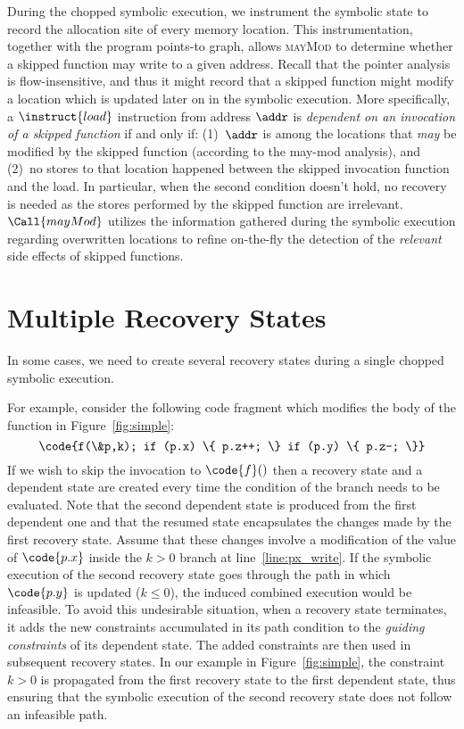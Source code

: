 During the chopped symbolic execution, we instrument the symbolic
state to record the allocation site of every memory location. This
instrumentation, together with the program points-to graph, allows
\textsc{mayMod} to determine whether a skipped function may write to a
given address. Recall that the pointer analysis is flow-insensitive,
and thus it might record that a skipped function might modify a
location which is updated later on in the symbolic execution.  More
specifically, a $\instruct{load}$ instruction from address $\addr$ is
\emph{dependent on an invocation of a skipped function} if and only
if: (1)~$\addr$ is among the locations that \textit{may} be modified
by the skipped function (according to the may-mod analysis), and
(2)~no stores to that location happened between the skipped invocation
function and the load. In particular, when the second condition
doesn't hold, no recovery is needed as the stores performed by the
skipped function are irrelevant. $\Call{mayMod}$ utilizes the
information gathered during the symbolic execution regarding
overwritten locations to refine on-the-fly the detection of the
\emph{relevant} side effects of skipped functions.

\section{Multiple Recovery States}
\label{Se:MultiRecovery}
In some cases, we need to create several recovery states during a
single chopped symbolic execution.

For example, consider the following code fragment which modifies the
body of the  function in Figure~\ref{fig:simple}:
\[
\code{f(\&p,k); if (p.x) \{ p.z++; \} if (p.y) \{ p.z--; \}}
\]
If we wish to skip the invocation to $\code{f}()$ then a recovery
state and a dependent state are created every time the condition of
the branch needs to be evaluated. Note that the second dependent state
is produced from the first dependent one and that the resumed state
encapsulates the changes made by the first recovery state. Assume that
these changes involve a modification of the value of $\code{p.x}$
inside the $k>0$ branch at line~\ref{line:px_write}. If the symbolic
execution of the second recovery state goes through the path in which
$\code{p.y}$ is updated ($k\le0$), the induced combined execution
would be infeasible. To avoid this undesirable situation, when a
recovery state terminates, it adds the new constraints accumulated in
its path condition to the \textit{guiding constraints} of its dependent state. The added
constraints are then used in subsequent recovery states. In our
example in Figure~\ref{fig:simple}, the constraint $k > 0$ is
propagated from the first recovery state to the first dependent state,
thus ensuring that the symbolic execution of the second recovery state
does not follow an infeasible path.







